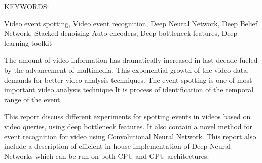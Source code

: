 \abstract

\noindent KEYWORDS: \hspace*{0.5em} \parbox[t]{4.4in}{Video event spotting, Video event recognition, Deep Neural Network, Deep Belief Network, Stacked denoising Auto-encoders, Deep bottleneck features, Deep learning toolkit }

\vspace*{24pt}

The amount of video information has dramatically increased in last decade fueled by the advancement of multimedia. This exponential growth of the video data, demands for better video analysis techniques. The event spotting is one of most important video analysis technique It is process of identification of the temporal range of the event. 

This report discuss different experiments for spotting events in videos based on video queries, using deep bottleneck features. It also contain a novel method for event recognition for video using Convolutional Neural Network. This report also include a description of efficient in-house implementation of Deep Neural Networks which can be run on both CPU and GPU architectures.
\pagebreak